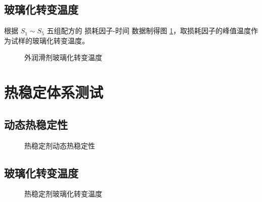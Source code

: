 \subsection{玻璃化转变温度}

根据 $S_1 \sim S_5$ 五组配方的 损耗因子-时间 数据制得图 \ref{fig2Tg}，取损耗因子的峰值温度作为试样的玻璃化转变温度。

\begin{figure}[!htb]
    \begin{center}
        
    \end{center}
    \caption{外润滑剂玻璃化转变温度}
    \label{fig2Tg}
\end{figure}

\section{热稳定体系测试}

\subsection{动态热稳定性}
\begin{figure}[H]
    \begin{center}
        
    \end{center}
    \caption{热稳定剂动态热稳定性}
\end{figure}

\subsection{玻璃化转变温度}
\begin{figure}[H]
    \begin{center}
        
    \end{center}
    \caption{热稳定剂玻璃化转变温度}
\end{figure}
